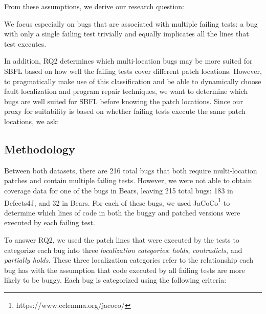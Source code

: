 \documentclass[10pt, conference]{IEEEtran}
\begin{document}
From these assumptions, we derive our research question: 


We focus especially on bugs that are associated with multiple failing tests: a bug
with only a single failing test trivially and equally implicates all the lines
that test executes. 


In addition, RQ2 determines which multi-location bugs may be more suited for SBFL 
based on how well the failing tests cover different patch locations. However, to pragmatically 
make use of this classification and be able to dynamically choose fault localization and program 
repair techniques, we want to determine which bugs are well suited for SBFL before knowing 
the patch locations. Since our proxy for suitability is based on whether failing tests execute 
the same patch locations, we ask:


\subsection{Methodology}

Between both datasets, there are 216 total bugs that both require multi-location
patches and contain multiple failing tests. However, we were not able to obtain coverage 
data for one of the bugs in Bears, leaving 215 total bugs: 183 in Defects4J, and 32 in
Bears. 
For each of these bugs, we used JaCoCo\footnote{https://www.eclemma.org/jacoco/}
to determine which lines of code in both the buggy and patched versions were executed
by each failing test.

To answer RQ2, we used the patch lines that were executed by the tests to categorize 
each bug into three \emph{localization categories}: \emph{holds}, \emph{contradicts}, and 
\emph{partially holds}. These three localization categories refer to the relationship each bug has 
with 
the assumption that code executed by all failing tests are more likely to be buggy. Each bug is 
categorized using the following criteria:
\end{document}
